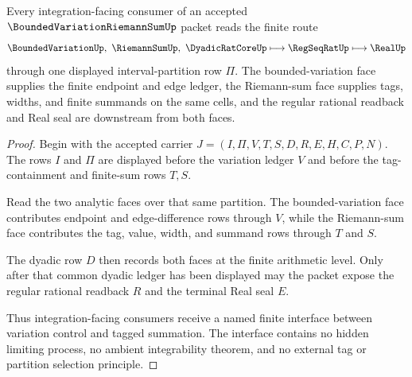 \begin{theorem}
\label{thm:bounded-variation-riemann-sum-finite-interface}
Every integration-facing consumer of an accepted $\BoundedVariationRiemannSumUp$ packet reads the finite route
$$
\BoundedVariationUp,\ \RiemannSumUp,\ \DyadicRatCoreUp
\longmapsto
\RegSeqRatUp \longmapsto \RealUp
$$
through one displayed interval-partition row $\Pi$. The bounded-variation face supplies the finite endpoint and edge ledger, the Riemann-sum face supplies tags, widths, and finite summands on the same cells, and the regular rational readback and Real seal are downstream from both faces.
\end{theorem}
\begin{proof}
Begin with the accepted carrier $J=(I,\Pi,V,T,S,D,R,E,H,C,P,N)$. The rows $I$ and $\Pi$ are displayed before the variation ledger $V$ and before the tag-containment and finite-sum rows $T,S$.

Read the two analytic faces over that same partition. The bounded-variation face contributes endpoint and edge-difference rows through $V$, while the Riemann-sum face contributes the tag, value, width, and summand rows through $T$ and $S$.

The dyadic row $D$ then records both faces at the finite arithmetic level. Only after that common dyadic ledger has been displayed may the packet expose the regular rational readback $R$ and the terminal Real seal $E$.

Thus integration-facing consumers receive a named finite interface between variation control and tagged summation. The interface contains no hidden limiting process, no ambient integrability theorem, and no external tag or partition selection principle.
\end{proof}



